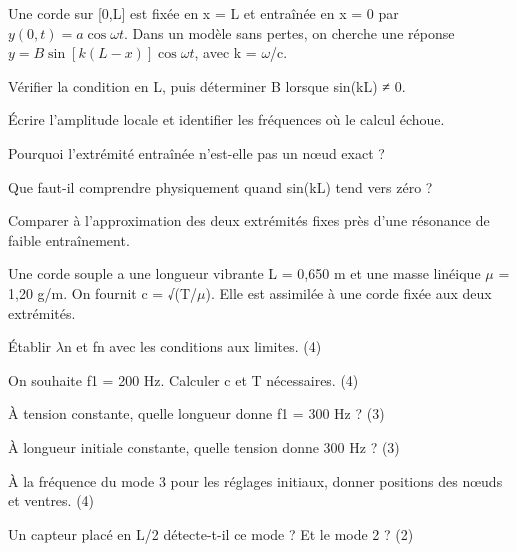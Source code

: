 \label{ex-D3}
Une corde sur [0,L] est fixée en x = L et entraînée en x = 0 par $y(0,t)=a\cos\omega t$. Dans un modèle sans pertes, on cherche une réponse $y=B\sin[k(L-x)]\cos\omega t$, avec k = \ensuremath{\omega}/c.\begin{questions}
\item Vérifier la condition en L, puis déterminer B lorsque sin(kL) ≠ 0.
\item Écrire l’amplitude locale et identifier les fréquences où le calcul échoue.
\item Pourquoi l’extrémité entraînée n’est-elle pas un nœud exact ?
\item Que faut-il comprendre physiquement quand sin(kL) tend vers zéro ?
\item Comparer à l’approximation des deux extrémités fixes près d’une résonance de faible entraînement.
\end{questions}


Une corde souple a une longueur vibrante L = 0,650 m et une masse linéique \ensuremath{\mu} = 1,20 g/m. On fournit c = √(T/\ensuremath{\mu}). Elle est assimilée à une corde fixée aux deux extrémités.
\begin{questions}
\item Établir \ensuremath{\lambda}n et fn avec les conditions aux limites. (4)
\item On souhaite f1 = 200 Hz. Calculer c et T nécessaires. (4)
\end{questions}

\begin{questions}
\item À tension constante, quelle longueur donne f1 = 300 Hz ? (3)
\item À longueur initiale constante, quelle tension donne 300 Hz ? (3)
\end{questions}

\begin{questions}
\item À la fréquence du mode 3 pour les réglages initiaux, donner positions des nœuds et ventres. (4)
\item Un capteur placé en L/2 détecte-t-il ce mode ? Et le mode 2 ? (2)
\end{questions}



